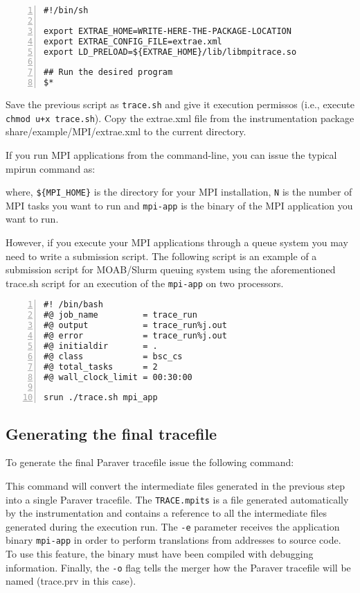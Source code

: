 \begin{Verbatim}[frame=single,numbers=left,labelposition=topline,label=trace.sh]
#!/bin/sh

export EXTRAE_HOME=WRITE-HERE-THE-PACKAGE-LOCATION
export EXTRAE_CONFIG_FILE=extrae.xml
export LD_PRELOAD=${EXTRAE_HOME}/lib/libmpitrace.so

## Run the desired program
$*
\end{Verbatim}

Save the previous script as {\tt trace.sh} and give it execution permissos (i.e., execute {\tt chmod u+x trace.sh}). Copy the extrae.xml file from the instrumentation package share/example/MPI/extrae.xml to the current directory.

If you run MPI applications from the command-line, you can issue the typical mpirun command as:


where, {\tt \$\{MPI\_HOME\}} is the directory for your MPI installation, {\tt N} is the number of MPI tasks you want to run and {\tt mpi-app} is the binary of the MPI application you want to run.

However, if you execute your MPI applications through a queue system you may need to write a submission script. The following script is an example of a submission script for MOAB/Slurm queuing system using the aforementioned trace.sh script for an execution of the {\tt mpi-app} on two processors.

\begin{Verbatim}[frame=single,numbers=left,labelposition=topline,label=slurm-moab.sh]
#! /bin/bash
#@ job_name         = trace_run
#@ output           = trace_run%j.out
#@ error            = trace_run%j.out
#@ initialdir       = .
#@ class            = bsc_cs
#@ total_tasks      = 2
#@ wall_clock_limit = 00:30:00

srun ./trace.sh mpi_app 
\end{Verbatim}

\subsection{Generating the final tracefile}

To generate the final Paraver tracefile issue the following command:


This command will convert the intermediate files generated in the previous step into a single Paraver tracefile. The {\tt TRACE.mpits} is a file generated automatically by the instrumentation and contains a reference to all the intermediate files generated during the execution run. The {\tt -e} parameter receives the application binary {\tt mpi-app} in order to perform translations from addresses to source code. To use this feature, the binary must have been compiled with debugging information. Finally, the {\tt -o} flag tells the merger how the Paraver tracefile will be named (trace.prv in this case).

